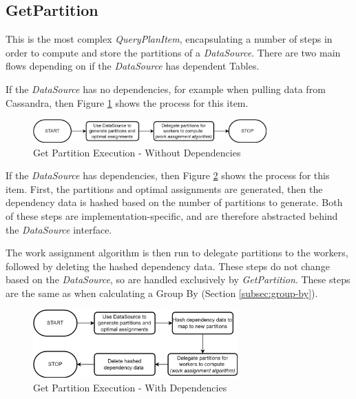 \subsection{GetPartition}\label{subsec:get-partition}
This is the most complex \textit{QueryPlanItem}, encapsulating a number of steps in order to compute and store the partitions of a \textit{DataSource}. There are two main flows depending on if the \textit{DataSource} has dependent Tables.

If the \textit{DataSource} has no dependencies, for example when pulling data from Cassandra, then Figure \ref{fig:get-partition-no-dependencies} shows the process for this item. 

\begin{figure}[h]
	\centering
	\includegraphics[width=0.8\textwidth]{chapters/diagrams/implementation/get-partition-no-dependencies-flow}
	\caption{Get Partition Execution - Without Dependencies}
	\label{fig:get-partition-no-dependencies}
\end{figure}

If the \textit{DataSource} has dependencies, then Figure \ref{fig:get-partition-dependencies} shows the process for this item. First, the partitions and optimal assignments are generated, then the dependency data is hashed based on the number of partitions to generate. Both of these steps are implementation-specific, and are therefore abstracted behind the \textit{DataSource} interface. 

The work assignment algorithm is then run to delegate partitions to the workers, followed by deleting the hashed dependency data. These steps do not change based on the \textit{DataSource}, so are handled exclusively by \textit{GetPartition}. These steps are the same as when calculating a Group By (Section \ref{subsec:group-by}).

\begin{figure}[h]
	\centering
	\includegraphics[width=0.7\textwidth]{chapters/diagrams/implementation/get-partition-dependencies-flow}
	\caption{Get Partition Execution - With Dependencies}
	\label{fig:get-partition-dependencies}
\end{figure}

